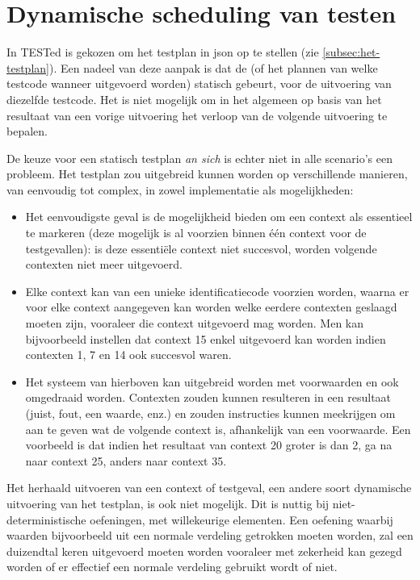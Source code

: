 \section{Dynamische scheduling van testen}\label{sec:dynamisch-schedulen-van-testgevallen}

In TESTed is gekozen om het testplan in json op te stellen (zie \cref{subsec:het-testplan}).
Een nadeel van deze aanpak is dat de  (of het plannen van welke testcode wanneer uitgevoerd worden) statisch gebeurt, voor de uitvoering van diezelfde testcode.
Het is niet mogelijk om in het algemeen op basis van het resultaat van een vorige uitvoering het verloop van de volgende uitvoering te bepalen.

De keuze voor een statisch testplan \emph{an sich} is echter niet in alle scenario's een probleem.
Het testplan zou uitgebreid kunnen worden op verschillende manieren, van eenvoudig tot complex, in zowel implementatie als mogelijkheden:

\begin{itemize}
    \item Het eenvoudigste geval is de mogelijkheid bieden om een context als essentieel te markeren (deze mogelijk is al voorzien binnen één context voor de testgevallen): is deze essentiële context niet succesvol, worden volgende contexten niet meer uitgevoerd.
    \item Elke context kan van een unieke identificatiecode voorzien worden, waarna er voor elke context aangegeven kan worden welke eerdere contexten geslaagd moeten zijn, vooraleer die context uitgevoerd mag worden.
    Men kan bijvoorbeeld instellen dat context 15 enkel uitgevoerd kan worden indien contexten 1, 7 en 14 ook succesvol waren.
    \item Het systeem van hierboven kan uitgebreid worden met voorwaarden en ook omgedraaid worden.
    Contexten zouden kunnen resulteren in een resultaat (juist, fout, een waarde, enz.) en zouden instructies kunnen meekrijgen om aan te geven wat de volgende context is, afhankelijk van een voorwaarde.
    Een voorbeeld is dat indien het resultaat van context 20 groter is dan 2, ga na naar context 25, anders naar context 35.
\end{itemize}

Het herhaald uitvoeren van een context of testgeval, een andere soort dynamische uitvoering van het testplan, is ook niet mogelijk.
Dit is nuttig bij niet-deterministische oefeningen, met willekeurige elementen.
Een oefening waarbij waarden bijvoorbeeld uit een normale verdeling getrokken moeten worden, zal een duizendtal keren uitgevoerd moeten worden vooraleer met zekerheid kan gezegd worden of er effectief een normale verdeling gebruikt wordt of niet.


